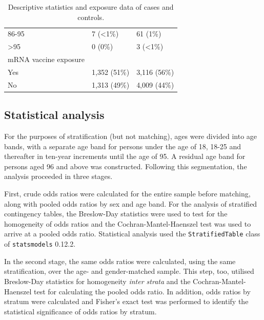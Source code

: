 \documentclass{article}
\begin{document}
\begin{table}[]
\begin{tabular}{@{}lll@{}}
\rowcolor[HTML]{EFEFEF}
\hspace{5mm}86-95                 & 7 (\textless{}1\%) & 61 (1\%)           \\
\rowcolor[HTML]{C0C0C0}
\hspace{5mm}\textgreater{}95      & 0 (0\%)            & 3 (\textless{}1\%) \\ \midrule
mRNA vaccine exposure &                    &                    \\
\rowcolor[HTML]{EFEFEF}
\hspace{5mm}Yes                   & 1,352 (51\%)       & 3,116 (56\%)       \\
\rowcolor[HTML]{C0C0C0}
\hspace{5mm}No                    & 1,313 (49\%)       & 4,009 (44\%)
\end{tabular}%
\caption{Descriptive statistics and exposure data of cases and controls.}
\label{tab:case-control-characteristics}
\end{table}

\subsection{Statistical analysis}

For the purposes of stratification (but not matching), ages were divided into age bands, with a separate age band for persons under the age of 18, 18-25 and thereafter in ten-year increments until the age of 95.
A residual age band for persons aged 96 and above was constructed. Following this segmentation, the analysis proceeded in three stages.

First, crude odds ratios were calculated for the entire sample before matching, along with pooled odds ratios by sex and age band.
For the analysis of stratified contingency tables, the Breslow-Day statistics were used to test for the homogeneity of odds ratios and the Cochran-Mantel-Haenszel test was used to arrive at a pooled odds ratio.
Statistical analysis used the \texttt{StratifiedTable} class of \texttt{statsmodels} 0.12.2.\cite{seabold2010statsmodels}

In the second stage, the same odds ratios were calculated, using the same stratification, over the age- and gender-matched sample.
This step, too, utilised Breslow-Day statistics for homogeneity \textit{inter strata} and the Cochran-Mantel-Haenszel test for calculating the pooled odds ratio.
In addition, odds ratios by stratum were calculated and Fisher's exact test was performed to identify the statistical significance of odds ratios by stratum.
\end{document}
